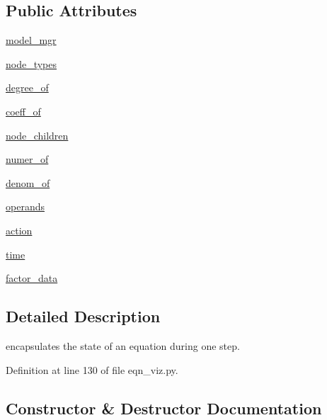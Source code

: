 \subsection*{Public Attributes}
\begin{DoxyCompactItemize}
\item 
\hyperlink{classeqn__viz_1_1_equation_step_parser_a93ede38f68a767bd5695118bbae0f4ab}{model\+\_\+mgr}
\item 
\hyperlink{classeqn__viz_1_1_equation_step_parser_a4d627b5f29df68f6003bf0c92ff6aa2c}{node\+\_\+types}
\item 
\hyperlink{classeqn__viz_1_1_equation_step_parser_af057f41fb578e2d24e016b20673e713b}{degree\+\_\+of}
\item 
\hyperlink{classeqn__viz_1_1_equation_step_parser_a4b9eb7c97b3266f4f87a7c545dc872f6}{coeff\+\_\+of}
\item 
\hyperlink{classeqn__viz_1_1_equation_step_parser_a1d4d9cccd84778db5989225109d04fff}{node\+\_\+children}
\item 
\hyperlink{classeqn__viz_1_1_equation_step_parser_ada3e129c73dec4aa0594851d26e722af}{numer\+\_\+of}
\item 
\hyperlink{classeqn__viz_1_1_equation_step_parser_a4d55f5976bf9cd223d905f410a17beef}{denom\+\_\+of}
\item 
\hyperlink{classeqn__viz_1_1_equation_step_parser_a8dbcb5a11bdc6d35899333318be43e66}{operands}
\item 
\hyperlink{classeqn__viz_1_1_equation_step_parser_aaed9539571b1f81f12baccf92f11dd0b}{action}
\item 
\hyperlink{classeqn__viz_1_1_equation_step_parser_af3fdecc987d26e93a0a0944c4e634fe3}{time}
\item 
\hyperlink{classeqn__viz_1_1_equation_step_parser_a0b9f938bbf87279aa6284bc2d679332f}{factor\+\_\+data}
\end{DoxyCompactItemize}


\subsection{Detailed Description}
\begin{DoxyVerb}encapsulates the state of an equation during one step.\end{DoxyVerb}
 

Definition at line 130 of file eqn\+\_\+viz.\+py.



\subsection{Constructor \& Destructor Documentation}
\hypertarget{classeqn__viz_1_1_equation_step_parser_a15f0da684dd315e98aa51421644884c2}{}
